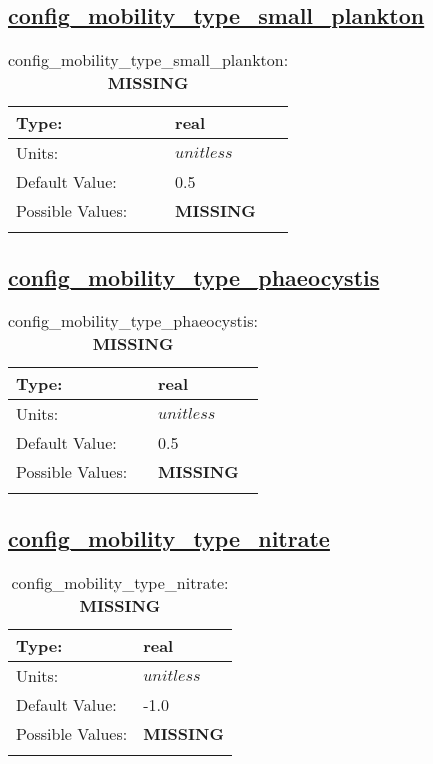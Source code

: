 \subsection[config\_mobility\_type\_small\_plankton]{\hyperref[sec:nm_tab_biogeochemistry]{config\_mobility\_type\_small\_plankton}}
\label{subsec:nm_sec_config_mobility_type_small_plankton}
\begin{center}
\begin{longtable}{| p{2.0in} || p{4.0in} |}
    \hline
    Type: & real \\
    \hline
    Units: & $unitless$ \\
    \hline
    Default Value: & 0.5 \\
    \hline
    Possible Values: & {\bf \color{red} MISSING} \\
    \hline
    \caption{config\_mobility\_type\_small\_plankton: {\bf \color{red} MISSING}}
\end{longtable}
\end{center}
\subsection[config\_mobility\_type\_phaeocystis]{\hyperref[sec:nm_tab_biogeochemistry]{config\_mobility\_type\_phaeocystis}}
\label{subsec:nm_sec_config_mobility_type_phaeocystis}
\begin{center}
\begin{longtable}{| p{2.0in} || p{4.0in} |}
    \hline
    Type: & real \\
    \hline
    Units: & $unitless$ \\
    \hline
    Default Value: & 0.5 \\
    \hline
    Possible Values: & {\bf \color{red} MISSING} \\
    \hline
    \caption{config\_mobility\_type\_phaeocystis: {\bf \color{red} MISSING}}
\end{longtable}
\end{center}
\subsection[config\_mobility\_type\_nitrate]{\hyperref[sec:nm_tab_biogeochemistry]{config\_mobility\_type\_nitrate}}
\label{subsec:nm_sec_config_mobility_type_nitrate}
\begin{center}
\begin{longtable}{| p{2.0in} || p{4.0in} |}
    \hline
    Type: & real \\
    \hline
    Units: & $unitless$ \\
    \hline
    Default Value: & -1.0 \\
    \hline
    Possible Values: & {\bf \color{red} MISSING} \\
    \hline
    \caption{config\_mobility\_type\_nitrate: {\bf \color{red} MISSING}}
\end{longtable}
\end{center}
